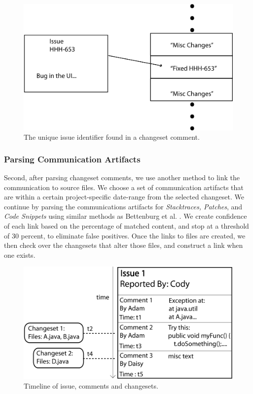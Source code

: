 \documentclass[conference]{IEEEtran}
\begin{document}
\begin{figure}[b!]
\centering
\includegraphics[width=1.0\columnwidth]{CommitsToChangesets1}
\caption{The unique issue identifier found in a changeset comment.\label{fig:identifier}}
\end{figure}

\subsubsection{Parsing Communication Artifacts}
Second, after parsing changeset comments, we use another method to link the communication to source files.  We choose a set of communication artifacts that are within a certain project-specific date-range from the selected changeset.  We continue by parsing the communications artifacts for \textit{Stacktraces, Patches}, and \textit{Code Snippets} using similar methods as Bettenburg et al. \cite{Bettenburg:2008:ESI:1370750.1370757}.  We create confidence of each link based on the percentage of matched content, and stop at a threshold of 30 percent, to eliminate false positives.  Once the links to files are created, we then check over the changesets that alter those files, and construct a link when one exists.  

\begin{figure}[t!]
\centering
\includegraphics[width=1.0\columnwidth]{Items}
\caption{Timeline of issue, comments and changesets.\label{fig:items}}
\end{figure}
\end{document}
